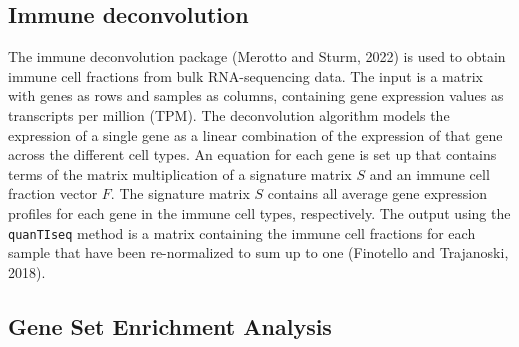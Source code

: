 \documentclass[
  parskip,
  openany]{scrreprt}
\begin{document}
\hypertarget{immune-deconvolution}{%
\subsection{Immune deconvolution}\label{immune-deconvolution}}

The immune deconvolution package (Merotto and Sturm, 2022) is used to
obtain immune cell fractions from bulk RNA-sequencing data. The input is
a matrix with genes as rows and samples as columns, containing gene
expression values as transcripts per million (TPM). The deconvolution
algorithm models the expression of a single gene as a linear combination
of the expression of that gene across the different cell types. An
equation for each gene is set up that contains terms of the matrix
multiplication of a signature matrix \(S\) and an immune cell fraction
vector \(F\). The signature matrix \(S\) contains all average gene
expression profiles for each gene in the immune cell types,
respectively. The output using the \texttt{quanTIseq} method is a matrix
containing the immune cell fractions for each sample that have been
re-normalized to sum up to one (Finotello and Trajanoski, 2018).

\hypertarget{gene-set-enrichment-analysis}{%
\subsection{Gene Set Enrichment
Analysis}\label{gene-set-enrichment-analysis}}
\end{document}
